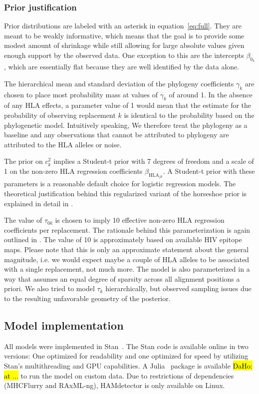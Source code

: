\documentclass{bioinfo}
\begin{document}
\begin{methods}
\subsubsection{Prior justification}

Prior distributions are labeled with an asterisk in equation~\ref{eq:full}. They are meant to be weakly informative, which means that the goal is to provide some modest amount of shrinkage while still allowing for large absolute values given enough support by the observed data. One exception to this are the intercepts \(\beta_{0_k}\), which are essentially flat because they are well identified by the data alone.

The hierarchical mean and standard deviation of the phylogeny coefficients \(\gamma_{k}\) are chosen to place most probability mass at values of \(\gamma_{k}\) of around 1. In the absence of any HLA effects, a parameter value of 1 would mean that the estimate for the probability of observing replacement \(k\) is identical to the probability based on the phylogenetic model. Intuitively speaking, We therefore treat the phylogeny as a baseline and any observations that cannot be attributed to phylogeny are attributed to the HLA alleles or noise.

The prior on \(c_{k}^{2}\) implies a Student-t prior with 7 degrees of freedom and a scale of 1 on the non-zero HLA regression coefficients \(\beta_{\text{HLA}_{jk}}\). A Student-t prior with these parameters is a reasonable default choice for logistic regression models. The theoretical justification behind this regularized variant of the horseshoe prior is explained in detail in \citet{Piironen2017}.

The value of \(\tau_{0k}\) is chosen to imply 10 effective non-zero HLA regression coefficients per replacement. The rationale behind this parameterization is again outlined in \citet{Piironen2017}. The value of 10 is approximately based on available HIV epitope maps. Please note that this is only an approximate statement about the general magnitude, i.e. we would expect maybe a couple of HLA alleles to be associated with a single replacement, not much more.
The model is also parameterized in a way that assumes an equal degree of sparsity across all alignment positions a priori. We also tried to model \(\tau_k\) hierarchically, but observed sampling issues due to the resulting unfavorable geometry of the posterior.


\subsection{Model implementation}
All models were implemented in Stan~\citep{Stan2021}. The Stan code is available online in two versions: One optimized for readability and one optimized for speed by utilizing Stan's multithreading and GPU capabilities.
A Julia~\citep{Bezanson2017} package is available \hl{DaHo: at ...} to run the model on custom data. Due to restrictions of dependencies (MHCFlurry and RAxML-ng), HAMdetector is only available on Linux. %



\end{methods}
\end{document}
